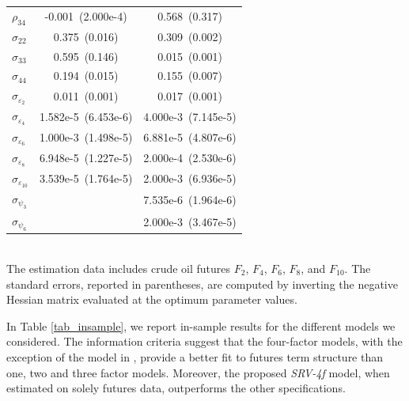 \documentclass{article}
\begin{document}
\begin{table}[h!]
\begin{tabular}{l S[table-format=2.3(1.3)] S[table-format=2.3(1.3)]}
{$\rho_{34}$} & -0.001 \,(2.000e-4) & 0.568 \,(0.317) \\
{$\sigma_{22}$} & 0.375 \,(0.016) & 0.309 \,(0.002) \\
{$\sigma_{33}$} & 0.595 \,(0.146) & 0.015 \,(0.001) \\
{$\sigma_{44}$} & 0.194 \,(0.015) & 0.155 \,(0.007) \\
{$\sigma_{\varepsilon_2}$} & 0.011 \,(0.001) & 0.017 \,(0.001) \\
{$\sigma_{\varepsilon_4}$} & 1.582e-5 \,(6.453e-6) & 4.000e-3 \,(7.145e-5) \\
{$\sigma_{\varepsilon_6}$} & 1.000e-3 \,(1.498e-5) & 6.881e-5 \,(4.807e-6) \\
{$\sigma_{\varepsilon_8}$} & 6.948e-5 \,(1.227e-5) & 2.000e-4 \,(2.530e-6) \\
{$\sigma_{\varepsilon_{10}}$} & 3.539e-5 \,(1.764e-5) & 2.000e-3 \,(6.936e-5) \\
{$\sigma_{\psi_3}$} & {} & 7.535e-6 \,(1.964e-6) \\
{$\sigma_{\psi_6}$} & {} & 2.000e-3 \,(3.467e-5) \\
\bottomrule
\end{tabular}
\vspace{3mm}
\\
\footnotesize
The estimation data includes crude oil futures
\(F_2\), \(F_4\), \(F_6\), \(F_8\), and \(F_{10}\). The standard errors, reported in parentheses, are computed by inverting the negative Hessian matrix evaluated at the optimum parameter values. 
\end{table}




In Table \ref{tab_insample}, we report in-sample results for the different models we considered. The information criteria suggest that the four-factor models,  with the exception of the model in \cite{yan02}, provide a better fit to futures term structure than one, two and three factor models. Moreover, the proposed \textit{SRV-4f} model, when estimated on solely futures data, outperforms the other specifications.
\end{document}
